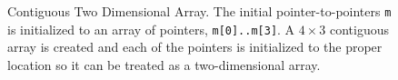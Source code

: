 \begin{figure}
{
}
\caption[Contiguous Two Dimensional Array]{Contiguous Two Dimensional Array.  
The initial pointer-to-pointers \texttt{m} is initialized to an array
of pointers, \texttt{m[0]..m[3]}.  A $4 \times 3$ contiguous
array is created and each of the pointers is initialized to the proper
location so it can be treated as a two-dimensional array.}
\label{figure:contiguous2DArray}
\end{figure}

%

